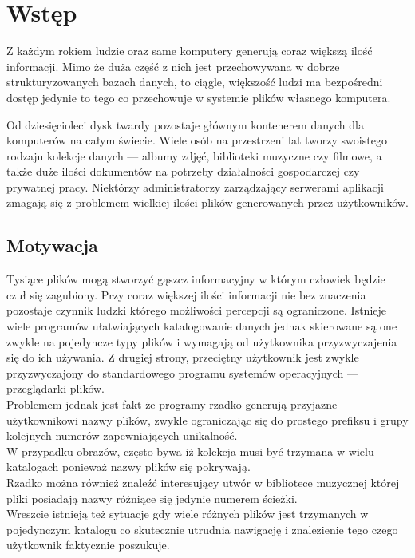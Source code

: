 \chapter{Wstęp}
\label{wstep}

\par
Z każdym rokiem ludzie oraz same komputery generują coraz większą ilość informacji.
Mimo że duża część z nich jest przechowywana w dobrze strukturyzowanych bazach danych, to ciągle, większość ludzi ma bezpośredni dostęp jedynie to tego co przechowuje w systemie plików własnego komputera.
\par
Od dziesięcioleci dysk twardy pozostaje głównym kontenerem danych dla komputerów na całym świecie.
Wiele osób na przestrzeni lat tworzy swoistego rodzaju kolekcje danych --- albumy zdjęć, biblioteki muzyczne czy filmowe, a także duże ilości dokumentów na potrzeby działalności gospodarczej czy prywatnej pracy. Niektórzy administratorzy zarządzający serwerami aplikacji zmagają się z problemem wielkiej ilości plików generowanych przez użytkowników.

\section{Motywacja}
\label{motywacja}
\par
Tysiące plików mogą stworzyć gąszcz informacyjny w którym człowiek będzie czuł się zagubiony. Przy coraz większej ilości informacji nie bez znaczenia pozostaje czynnik ludzki którego możliwości percepcji są ograniczone.
Istnieje wiele programów ułatwiających katalogowanie danych jednak skierowane są one zwykle na pojedyncze typy plików i wymagają od użytkownika przyzwyczajenia się do ich używania. Z drugiej strony, przeciętny użytkownik jest zwykle przyzwyczajony do standardowego programu systemów operacyjnych --- przeglądarki plików.\\

Problemem jednak jest fakt że programy rzadko generują przyjazne użytkownikowi nazwy plików, zwykle ograniczając się do prostego prefiksu i grupy kolejnych numerów zapewniających unikalność.\\
W przypadku obrazów, często bywa iż kolekcja musi być trzymana w wielu katalogach ponieważ nazwy plików się pokrywają.\\
Rzadko można również znaleźć interesujący utwór w bibliotece muzycznej której pliki posiadają nazwy różniące się jedynie numerem ścieżki.\\
Wreszcie istnieją też sytuacje gdy wiele różnych plików jest trzymanych w pojedynczym katalogu co skutecznie utrudnia nawigację i znalezienie tego czego użytkownik faktycznie poszukuje.

